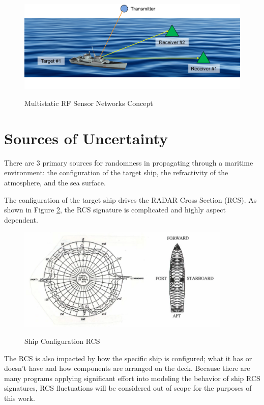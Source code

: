 \begin{figure}[H]
  \begin{center}
\includegraphics[width=5in]{../media/multistatic/ms_rf_concept.png}
  \end{center}
  \renewcommand{\baselinestretch}{1} \small\normalsize
  \begin{quote}
    \caption[Multistatic RF Sensor Networks Concept]{Multistatic RF Sensor Networks Concept\label{ms_fig:1}}
  \end{quote}
\end{figure}
\renewcommand{\baselinestretch}{2} \small\normalsize

\section{Sources of Uncertainty}
There are 3 primary sources for randomness in propagating through a maritime environment: the configuration of the target ship, the refractivity of the atmosphere, and the sea surface.

The configuration of the target ship drives the RADAR Cross Section (RCS). As shown in Figure \ref{rmt_fig:1}, the RCS signature is complicated and highly aspect dependent. 
\begin{figure}[H]
  \begin{center}
\includegraphics[width=4in]{../media/multistatic/shipconfig.png}
  \end{center}
  \renewcommand{\baselinestretch}{1} \small\normalsize
  \begin{quote}
    \caption[Ship Configuration RCS]{Ship Configuration RCS\label{rmt_fig:1}}
  \end{quote}
\end{figure}
\renewcommand{\baselinestretch}{2} \small\normalsize
The RCS is also impacted by how the specific ship is configured; what it has or doesn't have and how components are arranged on the deck. Because there are many programs applying significant effort into modeling the behavior of ship RCS signatures, RCS fluctuations will be considered out of scope for the purposes of this work.

